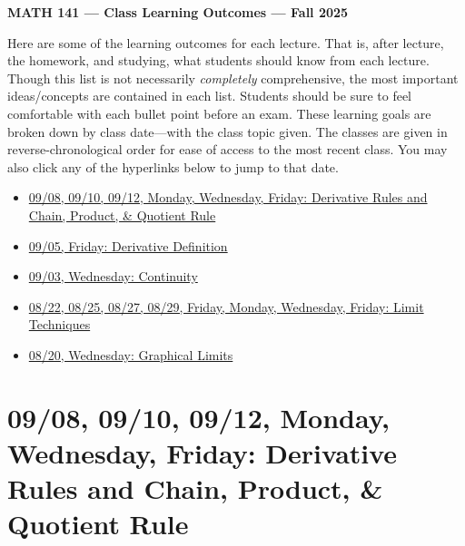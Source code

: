 \documentclass[11pt,letterpaper]{article}
\begin{document}
\begin{center} {\bfseries \LARGE MATH 141 --- Class Learning Outcomes --- Fall 2025} \end{center}

Here are some of the learning outcomes for each lecture. That is, after lecture, the homework, and studying, what students should know from each lecture. Though this list is not necessarily \textit{completely} comprehensive, the most important ideas/concepts are contained in each list. Students should be sure to feel comfortable with each bullet point before an exam. These learning goals are broken down by class date---with the class topic given. The classes are given in reverse-chronological order for ease of access to the most recent class. You may also click any of the hyperlinks below to jump to that date. 

\begin{itemize}
\item \hyperref[09-08--09-12]{09/08, 09/10, 09/12, Monday, Wednesday, Friday: Derivative Rules and Chain, Product, \& Quotient Rule}
\item \hyperref[09-05]{09/05, Friday: Derivative Definition}
\item \hyperref[09-03]{09/03, Wednesday: Continuity}
\item \hyperref[08-22--08-29]{08/22, 08/25, 08/27, 08/29, Friday, Monday, Wednesday, Friday: Limit Techniques}
\item \hyperref[08-20]{08/20, Wednesday: Graphical Limits}
\end{itemize}

\newpage
\section*{09/08, 09/10, 09/12, Monday, Wednesday, Friday: Derivative Rules and Chain, Product, \& Quotient Rule\label{09-08--09-12}}
\end{document}
